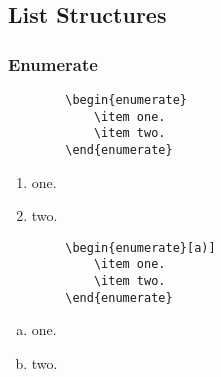 \documentclass{beamer}
\begin{document}
\subsection{List Structures}
\begin{frame}[fragile]
\frametitle{Enumerate} %
  \begin{multicols}{2}
    \begin{verbatim}
        \begin{enumerate}
            \item one.
            \item two.
        \end{enumerate}
    \end{verbatim}
  \columnbreak
    \begin{enumerate}
    	\item one.
        \item two.
    \end{enumerate}
  \end{multicols}

  \begin{multicols}{2}
    \begin{verbatim}
        \begin{enumerate}[a)]
            \item one.
            \item two.
        \end{enumerate}
    \end{verbatim}
  \columnbreak
    \begin{enumerate}[a)]
    	\item one.
        \item two.
    \end{enumerate}
  \end{multicols}
\end{frame}
\end{document}
